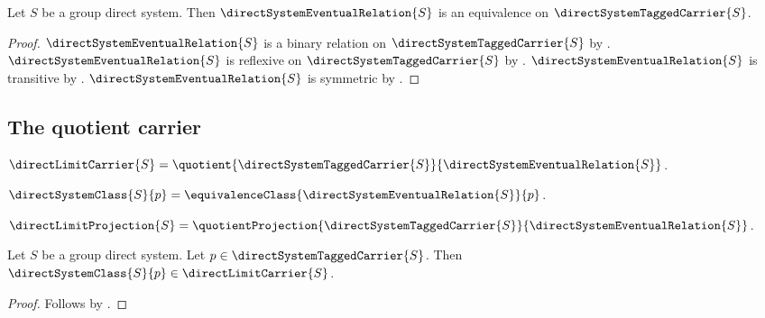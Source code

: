 \begin{theorem}\label{direct_system_eventual_is_equivalence}
    Let $S$ be a group direct system.
    Then $\directSystemEventualRelation{S}$ is an equivalence on
        $\directSystemTaggedCarrier{S}$.
\end{theorem}
\begin{proof}
    $\directSystemEventualRelation{S}$ is a binary relation on
        $\directSystemTaggedCarrier{S}$ by
        .
    $\directSystemEventualRelation{S}$ is reflexive on
        $\directSystemTaggedCarrier{S}$ by
        .
    $\directSystemEventualRelation{S}$ is transitive by
        .
    $\directSystemEventualRelation{S}$ is symmetric by
        .
\end{proof}

\subsection{The quotient carrier}

\begin{definition}\label{group_direct_limit_carrier}
    $\directLimitCarrier{S}=
        \quotient{\directSystemTaggedCarrier{S}}
            {\directSystemEventualRelation{S}}$.
\end{definition}

\begin{definition}\label{direct_system_class}
    $\directSystemClass{S}{p}=
        \equivalenceClass{\directSystemEventualRelation{S}}{p}$.
\end{definition}

\begin{definition}\label{group_direct_limit_projection}
    $\directLimitProjection{S}=
        \quotientProjection
            {\directSystemTaggedCarrier{S}}
            {\directSystemEventualRelation{S}}$.
\end{definition}

\begin{proposition}\label{direct_system_class_type}
    Let $S$ be a group direct system.
    Let $p\in\directSystemTaggedCarrier{S}$.
    Then $\directSystemClass{S}{p}\in\directLimitCarrier{S}$.
\end{proposition}
\begin{proof}
    Follows by
        .
\end{proof}

